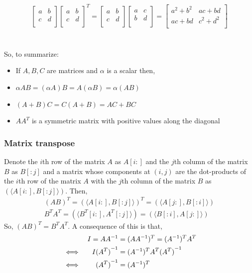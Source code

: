 \documentclass[MathsNotesBase.tex]{subfiles}
\begin{document}
{		\begin{align*}
			\begin{bmatrix}
			a & b \\
			c & d \\
			\end{bmatrix}
			\begin{bmatrix}
			a & b \\
			c & d \\
			\end{bmatrix}^{T}
			=
			\begin{bmatrix}
			a & b \\
			c & d \\
			\end{bmatrix}
			\begin{bmatrix}
			a & c \\
			b & d \\
			\end{bmatrix}
			=
			\begin{bmatrix}
			a^{2} + b^{2} & ac + bd \\
			ac + bd & c^{2} + d^{2} \\
			\end{bmatrix}		
		\end{align*}
		\\\\
		So, to summarize:
		\begin{itemize}
		\item[]{If $A,B,C$ are matrices and $\alpha$ is a scalar then,}
		\item{$\alpha AB = (\alpha A)B = A(\alpha B) = \alpha(AB)$}
		\item{$(A + B)C = C(A + B) = AC + BC$}
		\item{$AA^{T}$ is a symmetric matrix with positive values along the diagonal}
		\end{itemize}
		
		\bigskip
		\subsubsection*{Matrix transpose}
		Denote the $i$th row of the matrix $A$ as $A[i:]$ and the $j$th column of the matrix $B$ as $B[:j]$ and a matrix whose components at $(i,j)$ are the dot-products of the $i$th row of the matrix $A$ with the $j$th column of the matrix $B$ as $(\langle A[i:], B[:j] \rangle)$. Then,
		\begin{align*}
		(AB)^{T} = (\langle A[i:], B[:j] \rangle)^{T} = (\langle A[j:], B[:i] \rangle) \\
		B^{T}A^{T} = (\langle B^{T}[i:], A^{T}[:j] \rangle) = (\langle B[:i], A[j:] \rangle)
		\end{align*}
		So, $(AB)^{T} = B^{T}A^{T}$. A consequence of this is that,
		\begin{align*}
		&& I = A{A}^{-1} &= (AA^{-1})^{T} = (A^{-1})^{T}A^{T} \\
		& \iff & I{(A^{T})}^{-1} &= (A^{-1})^{T}A^{T}{(A^{T})}^{-1} \\
		& \iff & {(A^{T})}^{-1} &= (A^{-1})^{T}
		\end{align*}
		
}
\end{document}
